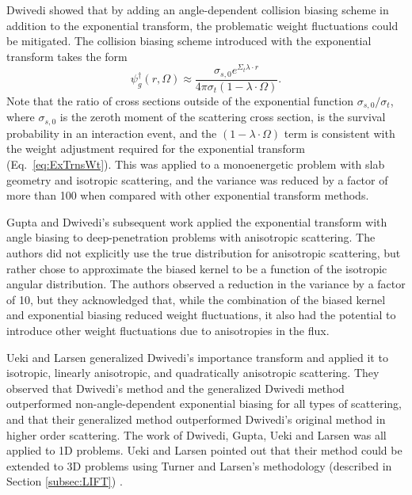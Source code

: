 Dwivedi \cite{dwivedi_new_1982} showed that by adding an angle-dependent collision
biasing scheme in addition to the exponential transform, the problematic weight
fluctuations could be mitigated. The collision biasing scheme introduced with
the exponential transform takes the form
\begin{equation}
  \psi_g^{\dagger}(r, \Omega) \approx \frac{\sigma_{s,0} e^{\Sigma_t\lambda \cdot r}}
  {4 \pi \sigma_t (1 - \lambda \cdot \Omega)}.
  \label{eq:DwivediTrns}
\end{equation}
Note that the ratio of cross sections outside of the exponential function
$\sigma_{s,0} / \sigma_t$, where $\sigma_{s,0}$ is the zeroth moment of the scattering cross section, is the survival probability in an interaction event, and
the $(1 - \lambda \cdot \Omega)$ term is consistent with the weight adjustment
required for the exponential transform (Eq.\ \eqref{eq:ExTrnsWt}).
This was applied to a monoenergetic problem
with slab geometry and isotropic scattering, and the variance was reduced by a
factor of more than 100 when compared with other exponential transform methods.

Gupta and Dwivedi's subsequent work \cite{gupta_sampling_1985} applied the
exponential transform with angle biasing to deep-penetration problems with
anisotropic scattering. The authors did not explicitly use the
true distribution for anisotropic scattering, but rather chose to approximate
the biased kernel to be a function of the isotropic angular distribution. The
authors observed a reduction in the variance by a factor of 10, but they
acknowledged that, while the combination of the biased kernel and exponential
biasing reduced weight fluctuations, it also had the potential to introduce
other weight fluctuations due to anisotropies in the flux.

Ueki and Larsen \cite{ueki_kinetic_1998}
generalized Dwivedi's importance transform and applied it to
isotropic, linearly anisotropic, and quadratically anisotropic scattering. They
observed that Dwivedi's method and the generalized Dwivedi method outperformed
non-angle-dependent exponential biasing for all types of scattering,
and that their generalized method
outperformed Dwivedi's original method in higher order scattering. The work
of Dwivedi, Gupta, Ueki and Larsen was all applied to 1D
problems. Ueki and Larsen pointed out that their method could be extended to
3D problems using Turner and Larsen's methodology
(described in Section \ref{subsec:LIFT})
\cite{ueki_kinetic_1998}.

